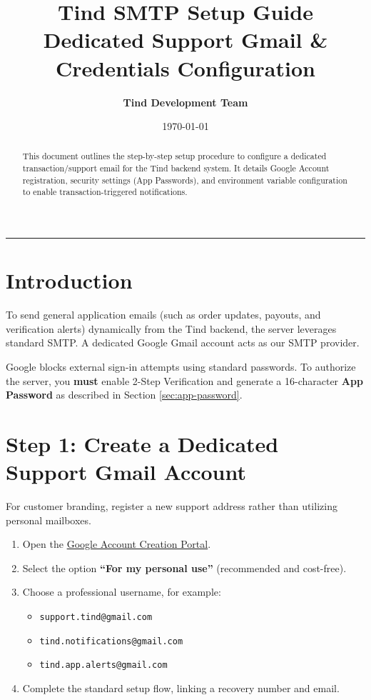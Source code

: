 \documentclass[11pt,a4paper]{article}
\title{\color{tindblue}\Huge\bfseries Tind SMTP Setup Guide \\ \Large\textmd{Dedicated Support Gmail \& Credentials Configuration}}
\author{\textbf{Tind Development Team}}
\date{\today}
\begin{document}
\maketitle

\begin{abstract}
This document outlines the step-by-step setup procedure to configure a dedicated transaction/support email for the Tind backend system. It details Google Account registration, security settings (App Passwords), and environment variable configuration to enable transaction-triggered notifications.
\end{abstract}

\hrule
\vspace{1.5em}

\section{Introduction}
To send general application emails (such as order updates, payouts, and verification alerts) dynamically from the Tind backend, the server leverages standard SMTP. A dedicated Google Gmail account acts as our SMTP provider. 

\begin{importantnote}
Google blocks external sign-in attempts using standard passwords. To authorize the server, you \textbf{must} enable 2-Step Verification and generate a 16-character \textbf{App Password} as described in Section \ref{sec:app-password}.
\end{importantnote}

\section{Step 1: Create a Dedicated Support Gmail Account}
For customer branding, register a new support address rather than utilizing personal mailboxes.
\begin{enumerate}
    \item Open the \href{https://accounts.google.com/signup}{Google Account Creation Portal}.
    \item Select the option \textbf{``For my personal use''} (recommended and cost-free).
    \item Choose a professional username, for example:
    \begin{itemize}
        \item \texttt{support.tind@gmail.com}
        \item \texttt{tind.notifications@gmail.com}
        \item \texttt{tind.app.alerts@gmail.com}
    \end{itemize}
    \item Complete the standard setup flow, linking a recovery number and email.
\end{enumerate}
\end{document}
